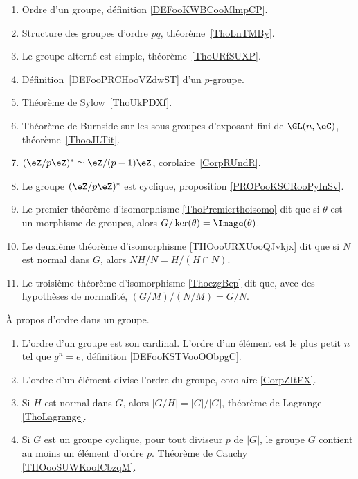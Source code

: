 \begin{enumerate}
	\item Ordre d'un groupe, définition \ref{DEFooKWBCooMlmpCP}.
	\item Structure des groupes d'ordre \( pq\), théorème~\ref{ThoLnTMBy}.
	\item Le groupe alterné est simple, théorème~\ref{ThoURfSUXP}.
	\item Définition~\ref{DEFooPRCHooVZdwST} d'un \( p\)-groupe.
	\item Théorème de Sylow~\ref{ThoUkPDXf}.
	\item Théorème de Burnside sur les sous-groupes d'exposant fini de \( \GL(n,\eC)\), théorème~\ref{ThooJLTit}.
	\item \( (\eZ/p\eZ)^*\simeq \eZ/(p-1)\eZ\), corolaire~\ref{CorpRUndR}.
	\item
	      Le groupe \( (\eZ/p\eZ)^*\) est cyclique, proposition \ref{PROPooKSCRooPyInSv}.
	\item Le premier théorème d'isomorphisme \ref{ThoPremierthoisomo} dit que si \( \theta\) est un morphisme de groupes, alors  \( G/\ker(\theta)=\Image(\theta)\).
	\item Le deuxième théorème d'isomorphisme \ref{THOooURXUooQJvkjx} dit que si \( N\) est normal dans \( G\), alors \( NH/N=H/(H\cap N)\).
	\item Le troisième théorème d'isomorphisme \ref{ThoezgBep} dit que, avec des hypothèses de normalité, \( (G/M)/(N/M)=G/N\).
\end{enumerate}

À propos d'ordre dans un groupe.
\begin{enumerate}
	\item
	      L'ordre d'un groupe est son cardinal. L'ordre d'un élément est le plus petit \( n\) tel que \( g^n=e\), définition \ref{DEFooKSTVooOObpgC}.
	\item
	      L'ordre d'un élément divise l'ordre du groupe, corolaire \ref{CorpZItFX}.
	\item
	      Si \( H\) est normal dans \( G\), alors \( | G/H |=| G |/| G |\), théorème de Lagrange \ref{ThoLagrange}.
	\item
	      Si \( G\) est un groupe cyclique, pour tout diviseur \( p\) de \( | G |\), le groupe \( G\) contient au moins un élément d'ordre \( p\). Théorème de Cauchy \ref{THOooSUWKooICbzqM}.
\end{enumerate}
